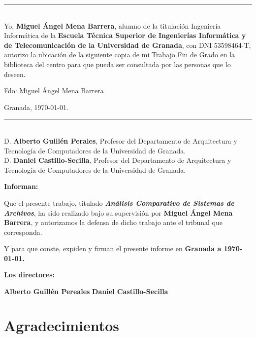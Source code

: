 \thispagestyle{empty}
\cleardoublepage
\thispagestyle{empty}
\vspace{3cm}

\noindent\rule[-1ex]{\textwidth}{2pt}\\[4.5ex]

Yo, \textbf{Miguel Ángel Mena Barrera}, alumno de la titulación Ingeniería Informática de la \textbf{Escuela Técnica Superior de Ingenierías Informática y de Telecomunicación de la Universidad de Granada}, con DNI 53598464-T, autorizo la ubicación de la siguiente copia de mi Trabajo Fin de Grado en la biblioteca del centro para que pueda ser consultada por las personas que lo deseen.

\vspace{6cm}

\noindent Fdo: Miguel Ángel Mena Barrera

\vspace{2cm}

\begin{flushright}
Granada, \today.
\end{flushright}



\thispagestyle{empty}
\cleardoublepage
\thispagestyle{empty}

\noindent\rule[-1ex]{\textwidth}{2pt}\\[4.5ex]

D. \textbf{Alberto Guillén Perales}, Profesor del Departamento de Arquitectura y Tecnología de Computadores de la Universidad de Granada.\\

D. \textbf{Daniel Castillo-Secilla}, Profesor del Departamento de Arquitectura y Tecnología de Computadores de la Universidad de Granada.


\vspace{0.5cm}

\textbf{Informan:}

\vspace{0.5cm}

Que el presente trabajo, titulado \textit{\textbf{Análisis Comparativo de Sistemas de Archivos}}, ha sido realizado bajo su supervisión por \textbf{Miguel Ángel Mena Barrera}, y autorizamos la defensa de dicho trabajo ante el tribunal que corresponda.

\vspace{0.5cm}

Y para que conste, expiden y firman el presente informe en \textbf{Granada a \today.}

\vspace{1cm}

\textbf{Los directores:}

\vspace{5cm}

\noindent \textbf{Alberto Guillén Pereales} \hspace{5cm} \textbf{Daniel Castillo-Secilla} 

\chapter*{Agradecimientos}
\thispagestyle{empty}

\vspace{1cm}


